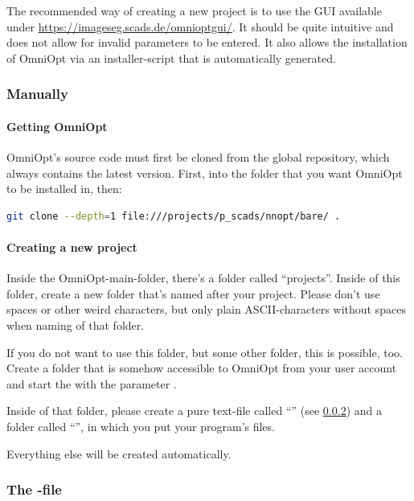 \documentclass[]{scrartcl}
\begin{document}
The recommended way of creating a new project is to use the GUI available under \url{https://imageseg.scads.de/omnioptgui/}.
It should be quite intuitive and does not allow for invalid parameters to be entered. It also allows the installation of
OmniOpt via an installer-script that is automatically generated.

\subsubsection{Manually}

\paragraph{Getting OmniOpt}

OmniOpt's source code must first be cloned from the global repository, which always contains the latest version.
First,  into the folder that you want OmniOpt to be installed in, then:

\begin{lstlisting}[language=bash]
git clone --depth=1 file:///projects/p_scads/nnopt/bare/ .
\end{lstlisting}

\paragraph{Creating a new project}

Inside the OmniOpt-main-folder, there's a folder called ``projects''. Inside of this folder, create a new
folder that's named after your project. Please don't use spaces or other weird characters, but only
plain ASCII-characters without spaces when naming of that folder.

If you do not want to use this folder, but some other folder, this is possible, too. Create a folder that
is somehow accessible to OmniOpt from your user account and start the 
 with the parameter .

Inside of that folder, please create a pure text-file called ``'' (see \ref{configini})
and a folder called ``'', in which you put your program's files.

Everything else will be created automatically.

\subsubsection{The -file}
\label{configini}
\end{document}
